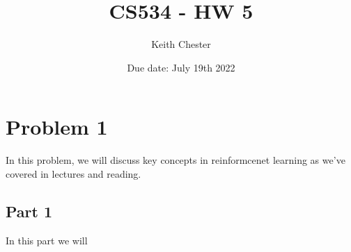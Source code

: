 \documentclass{article}
\title{CS534 - HW 5}
\author{Keith Chester}
\date{Due date: July 19th 2022}
\begin{document}
\maketitle

\section*{Problem 1}

In this problem, we will discuss key concepts in reinformcenet learning as we've covered in lectures and reading.

\subsection*{Part 1}

In this part we will 
\end{document}
